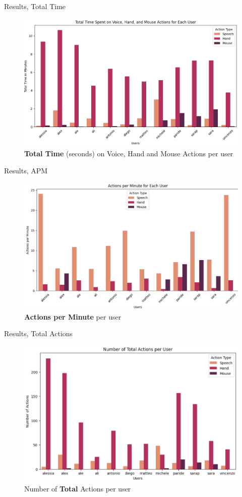 \documentclass[english]{beamer}
\begin{document}
\begin{frame}{Results, Total Time}
    \begin{figure}
        \centering
        \includegraphics[width=.8\textwidth]{images/total_time.png}
        \caption{\textbf{Total Time} (seconds) on Voice, Hand and Mouse Actions per user}
    \end{figure}
\end{frame}

\begin{frame}{Results, APM}
    \begin{figure}
        \centering
        \includegraphics[width=.8\textwidth]{images/actions_per_minutes.png}
        \caption{\textbf{Actions per Minute} per user}
    \end{figure}
\end{frame}

\begin{frame}{Results, Total Actions}
    \begin{figure}
        \centering
        \includegraphics[width=.8\textwidth]{images/total_actions.png}
        \caption{Number of \textbf{Total} Actions per user}
    \end{figure}
\end{frame}
\end{document}
